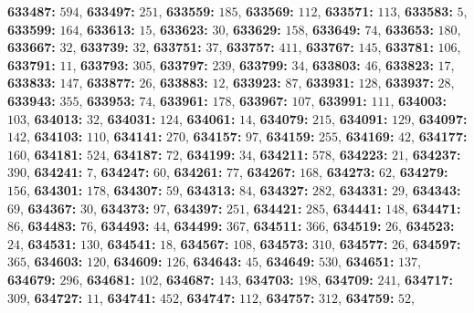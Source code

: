 \textsf{\bfseries 633487:} $594$, \textsf{\bfseries 633497:} $251$, \textsf{\bfseries 633559:} $185$, \textsf{\bfseries 633569:} $112$, \textsf{\bfseries 633571:} $113$, \textsf{\bfseries 633583:} $5$, \textsf{\bfseries 633599:} $164$, \textsf{\bfseries 633613:} $15$, \textsf{\bfseries 633623:} $30$, \textsf{\bfseries 633629:} $158$, \textsf{\bfseries 633649:} $74$, \textsf{\bfseries 633653:} $180$, \textsf{\bfseries 633667:} $32$, \textsf{\bfseries 633739:} $32$, \textsf{\bfseries 633751:} $37$, \textsf{\bfseries 633757:} $411$, \textsf{\bfseries 633767:} $145$, \textsf{\bfseries 633781:} $106$, \textsf{\bfseries 633791:} $11$, \textsf{\bfseries 633793:} $305$, \textsf{\bfseries 633797:} $239$, \textsf{\bfseries 633799:} $34$, \textsf{\bfseries 633803:} $46$, \textsf{\bfseries 633823:} $17$, \textsf{\bfseries 633833:} $147$, \textsf{\bfseries 633877:} $26$, \textsf{\bfseries 633883:} $12$, \textsf{\bfseries 633923:} $87$, \textsf{\bfseries 633931:} $128$, \textsf{\bfseries 633937:} $28$, \textsf{\bfseries 633943:} $355$, \textsf{\bfseries 633953:} $74$, \textsf{\bfseries 633961:} $178$, \textsf{\bfseries 633967:} $107$, \textsf{\bfseries 633991:} $111$, \textsf{\bfseries 634003:} $103$, \textsf{\bfseries 634013:} $32$, \textsf{\bfseries 634031:} $124$, \textsf{\bfseries 634061:} $14$, \textsf{\bfseries 634079:} $215$, \textsf{\bfseries 634091:} $129$, \textsf{\bfseries 634097:} $142$, \textsf{\bfseries 634103:} $110$, \textsf{\bfseries 634141:} $270$, \textsf{\bfseries 634157:} $97$, \textsf{\bfseries 634159:} $255$, \textsf{\bfseries 634169:} $42$, \textsf{\bfseries 634177:} $160$, \textsf{\bfseries 634181:} $524$, \textsf{\bfseries 634187:} $72$, \textsf{\bfseries 634199:} $34$, \textsf{\bfseries 634211:} $578$, \textsf{\bfseries 634223:} $21$, \textsf{\bfseries 634237:} $390$, \textsf{\bfseries 634241:} $7$, \textsf{\bfseries 634247:} $60$, \textsf{\bfseries 634261:} $77$, \textsf{\bfseries 634267:} $168$, \textsf{\bfseries 634273:} $62$, \textsf{\bfseries 634279:} $156$, \textsf{\bfseries 634301:} $178$, \textsf{\bfseries 634307:} $59$, \textsf{\bfseries 634313:} $84$, \textsf{\bfseries 634327:} $282$, \textsf{\bfseries 634331:} $29$, \textsf{\bfseries 634343:} $69$, \textsf{\bfseries 634367:} $30$, \textsf{\bfseries 634373:} $97$, \textsf{\bfseries 634397:} $251$, \textsf{\bfseries 634421:} $285$, \textsf{\bfseries 634441:} $148$, \textsf{\bfseries 634471:} $86$, \textsf{\bfseries 634483:} $76$, \textsf{\bfseries 634493:} $44$, \textsf{\bfseries 634499:} $367$, \textsf{\bfseries 634511:} $366$, \textsf{\bfseries 634519:} $26$, \textsf{\bfseries 634523:} $24$, \textsf{\bfseries 634531:} $130$, \textsf{\bfseries 634541:} $18$, \textsf{\bfseries 634567:} $108$, \textsf{\bfseries 634573:} $310$, \textsf{\bfseries 634577:} $26$, \textsf{\bfseries 634597:} $365$, \textsf{\bfseries 634603:} $120$, \textsf{\bfseries 634609:} $126$, \textsf{\bfseries 634643:} $45$, \textsf{\bfseries 634649:} $530$, \textsf{\bfseries 634651:} $137$, \textsf{\bfseries 634679:} $296$, \textsf{\bfseries 634681:} $102$, \textsf{\bfseries 634687:} $143$, \textsf{\bfseries 634703:} $198$, \textsf{\bfseries 634709:} $241$, \textsf{\bfseries 634717:} $309$, \textsf{\bfseries 634727:} $11$, \textsf{\bfseries 634741:} $452$, \textsf{\bfseries 634747:} $112$, \textsf{\bfseries 634757:} $312$, \textsf{\bfseries 634759:} $52$, 

